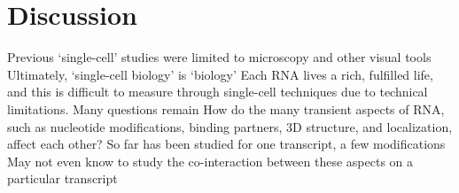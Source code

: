 \section{Discussion}

Previous ‘single-cell’ studies were limited to microscopy and other visual tools
Ultimately, ‘single-cell biology’ is ‘biology’
Each RNA lives a rich, fulfilled life, and this is difficult to measure through single-cell techniques due to technical limitations.
Many questions remain
How do the many transient aspects of RNA, such as nucleotide modifications, binding partners, 3D structure, and localization, affect each other?
So far has been studied for one transcript, a few modifications
May not even know to study the co-interaction between these aspects on a particular transcript

